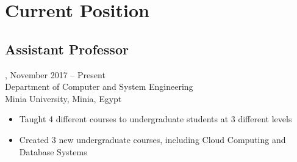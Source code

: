 \section{Current Position}
\subsection{Assistant Professor}, November 2017 -- Present\\
Department of Computer and System Engineering\\
Minia University, Minia, Egypt
\begin{itemize}
    \item Taught 4 different courses to undergraduate students at 3 different levels
    \item Created 3 new undergraduate courses, including Cloud Computing and Database Systems
\end{itemize}